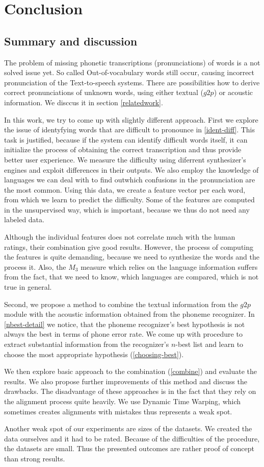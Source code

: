 \chapter*{Conclusion}
\section{Summary and discussion}
The problem of missing phonetic transcriptions (pronunciations) of words is a not solved issue yet.
So called Out-of-vocabulary words still occur, causing incorrect pronunciation of the Text-to-speech systems.
There are possibilities how to derive correct pronunciations of unknown words, using either textual ($g2p$) or acoustic information.
We disccus it in section \ref{relatedwork}.
\par
In this work, we try to come up with slightly different approach.
First we explore the issue of identyfying words that are difficult to pronounce in \ref{ident-diff}.
This task is justified, because if the system can identify difficult words itself, it can initialize the process of obtaining the correct transcription and thus provide better user experience.
We measure the difficulty using diferrent synthesizer's engines and exploit differences in their outputs.
We also employ the knowledge of languages we can deal with to find outwhich confusions in the pronunciation are the most common.
Using this data, we create a feature vector per each word, from which we learn to predict the difficulty.
Some of the features are computed in the unsupervised way, which is important, because we thus do not need any labeled data.
\par
Although the individual features does not correlate much with the human ratings, their combination give good results.
However, the process of computing the features is quite demanding, because we need to synthesize the words and the process it.
Also, the $M_3$ measure which relies on the language information suffers from the fact, that we need to know, which languages are compared, which is not true in general.
\par
Second, we propose a method to combine the textual information from the $g2p$ module with the acoustic information obtained from the phoneme recognizer.
In \ref{nbest-detail} we notice, that the phoneme recognizer's best hypothesis is not always the best in terms of phone error rate.
We come up with procedure to extract substantial information from the recognizer's $n$-best list and learn to choose the most appropriate hypothesis (\ref{choosing-best}).
\par
We then explore basic approach to the combination (\ref{combine}) and evaluate the results.
We also propose further improvements of this method and discuss the drawbacks.
The disadvantage of these approaches is in the fact that they rely on the alignment process quite heavily.
We use Dynamic Time Warping, which sometimes creates alignments with mistakes thus represents a weak spot.
\par
Another weak spot of our experiments are sizes of the datasets.
We created the data ourselves and it had to be rated.
Because of the difficulties of the procedure, the datasets are small.
Thus the presented outcomes are rather proof of concept than strong results.

